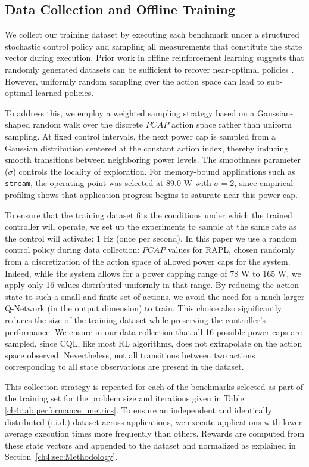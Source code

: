 \subsection{Data Collection and Offline Training}


We collect our training dataset by executing each benchmark under a structured stochastic control policy and sampling all measurements that constitute the state vector during execution. Prior work in offline reinforcement learning suggests that randomly generated datasets can be sufficient to recover near-optimal policies \cite{levine2020offline}. However, uniformly random sampling over the action space can lead to sub-optimal learned policies.

To address this, we employ a weighted sampling strategy based on a Gaussian-shaped random walk over the discrete $PCAP$ action space rather than uniform sampling. At fixed control intervals, the next power cap is sampled from a Gaussian distribution centered at the constant action index, thereby inducing smooth transitions between neighboring power levels. The smoothness parameter ($\sigma$) controls the locality of exploration. For memory-bound applications such as \texttt{stream}, the operating point was selected at $89.0$ W with $\sigma = 2$, since empirical profiling shows that application progress begins to saturate near this power cap. 

To ensure that the training dataset fits the conditions under which the trained controller will operate, we set up the experiments  to sample at the same rate as the control will activate: 1 Hz (once per second). In this paper we use a random control policy during data collection: $PCAP$ values for RAPL, chosen randomly from a discretization of the action space of allowed power caps for the system. Indeed, while the system allows for a power capping range of 78 \unit{\watt} to 165 \unit{\watt}, we apply only 16 values distributed uniformly in that range. By reducing the action state to such a small and finite set of actions, we avoid the need for a much larger Q-Network (in the output dimension)
to train. This choice also significantly reduces the size of the  training dataset while preserving the controller’s performance. We ensure in our data collection that all 16 possible power caps are sampled, since CQL, like most RL algorithms, does not extrapolate on the action space observed. Nevertheless, not all transitions between two actions corresponding to all state observations are present in the dataset. 

This collection strategy is repeated for each of the benchmarks selected as part of the training set for the problem size and iterations given in  Table \ref{ch4:tab:performance_metrics}. To ensure an independent and identically distributed (i.i.d.) dataset across applications, we execute applications with lower average execution times more frequently than others. Rewards are computed from these state vectors and appended to the dataset and normalized as explained in Section~\ref{ch4:sec:Methodology}.

